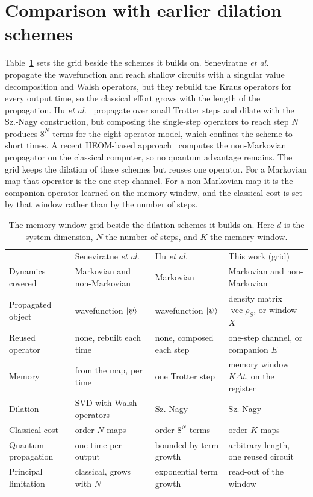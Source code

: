 \documentclass[aps,pra,twocolumn,superscriptaddress,nofootinbib,longbibliography]{revtex4-2}
\DeclareMathOperator{\vecc}{vec}
\newcommand{\rhoS}{\rho_{S}}
\newcommand{\dt}{\Delta t}
\begin{document}
\section{Comparison with earlier dilation schemes}
\label{app:compare}
Table~\ref{tab:compare} sets the grid beside the schemes it builds on.
Seneviratne \textit{et al.}~\cite{seneviratne2024} propagate the wavefunction and
reach shallow circuits with a singular value decomposition and Walsh operators,
but they rebuild the Kraus operators for every output time, so the classical
effort grows with the length of the propagation. Hu \textit{et
al.}~\cite{hu2022} propagate over small Trotter steps and dilate with the
Sz.-Nagy construction, but composing the single-step operators to reach step $N$
produces $8^{N}$ terms for the eight-operator model, which confines the scheme to
short times. A recent HEOM-based approach~\cite{dan2025} computes the
non-Markovian propagator on the classical computer, so no quantum advantage
remains. The grid keeps the dilation of these schemes but reuses one operator.
For a Markovian map that operator is the one-step channel. For a non-Markovian map
it is the companion operator learned on the memory window, and the classical cost
is set by that window rather than by the number of steps.

\begin{table}[t]
\caption{\label{tab:compare}
The memory-window grid beside the dilation schemes it builds on. Here $d$ is the
system dimension, $N$ the number of steps, and $K$ the memory window.}
\begin{ruledtabular}
\begin{tabular}{llll}
 & Seneviratne \textit{et al.}~\cite{seneviratne2024}
 & Hu \textit{et al.}~\cite{hu2022}
 & This work (grid) \\
\colrule
Dynamics covered      & Markovian and non-Markovian & Markovian & Markovian and non-Markovian \\
Propagated object     & wavefunction $\ket{\psi}$   & wavefunction $\ket{\psi}$ & density matrix $\vecc\rhoS$, or window $X$ \\
Reused operator       & none, rebuilt each time     & none, composed each step & one-step channel, or companion $E$ \\
Memory                & from the map, per time      & one Trotter step & memory window $K\dt$, on the register \\
Dilation              & SVD with Walsh operators    & Sz.-Nagy & Sz.-Nagy \\
Classical cost        & order $N$ maps              & order $8^{N}$ terms & order $K$ maps \\
Quantum propagation   & one time per output         & bounded by term growth & arbitrary length, one reused circuit \\
Principal limitation  & classical, grows with $N$   & exponential term growth & read-out of the window \\
\end{tabular}
\end{ruledtabular}
\end{table}



\end{document}
